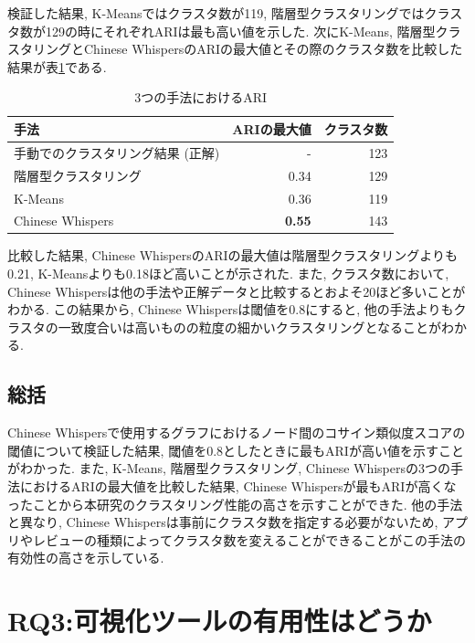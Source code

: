 検証した結果, K-Meansではクラスタ数が119, 階層型クラスタリングではクラスタ数が129の時にそれぞれARIは最も高い値を示した. 次にK-Means, 階層型クラスタリングとChinese WhispersのARIの最大値とその際のクラスタ数を比較した結果が表\ref{tb:two_ari}である. 

\begin{table}[H]
  \caption{3つの手法におけるARI}
  \label{tb:two_ari}
  \begin{center}
  \begin{tabularx}{\linewidth}{X|r|r}
    \hline
    手法&ARIの最大値&クラスタ数\\\hline\hline
    手動でのクラスタリング結果 (正解) &-&123\\\hline
    階層型クラスタリング&0.34&129\\\hline
    K-Means&0.36&119\\\hline
    Chinese Whispers&\textbf{0.55}&143\\\hline
  \end{tabularx}\end{center}
\end{table}

比較した結果, Chinese WhispersのARIの最大値は階層型クラスタリングよりも0.21, K-Meansよりも0.18ほど高いことが示された. また, クラスタ数において, Chinese Whispersは他の手法や正解データと比較するとおよそ20ほど多いことがわかる. 
この結果から, Chinese Whispersは閾値を0.8にすると, 他の手法よりもクラスタの一致度合いは高いものの粒度の細かいクラスタリングとなることがわかる. 

\subsection{総括}
Chinese Whispersで使用するグラフにおけるノード間のコサイン類似度スコアの閾値について検証した結果, 閾値を0.8としたときに最もARIが高い値を示すことがわかった. 
また, K-Means, 階層型クラスタリング, Chinese Whispersの3つの手法におけるARIの最大値を比較した結果, Chinese Whispersが最もARIが高くなったことから本研究のクラスタリング性能の高さを示すことができた. 
他の手法と異なり, Chinese Whispersは事前にクラスタ数を指定する必要がないため, アプリやレビューの種類によってクラスタ数を変えることができることがこの手法の有効性の高さを示している. 


\section{RQ3:可視化ツールの有用性はどうか}
